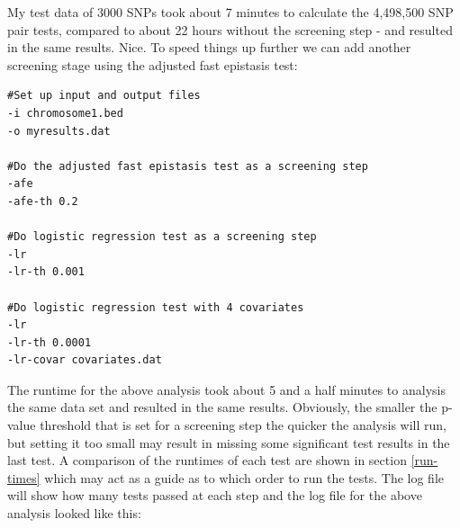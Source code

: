\documentclass[a4paper,12pt]{article}
\begin{document}
My test data of 3000 SNPs took about 7 minutes to calculate the 4,498,500 SNP pair tests, compared to about 22 hours without the screening step - and resulted in the same results. Nice. To speed things up further we can add another screening stage using the adjusted fast epistasis test: 
\vspace{0.35cm} \begin{lstlisting}
#Set up input and output files
-i chromosome1.bed
-o myresults.dat

#Do the adjusted fast epistasis test as a screening step
-afe
-afe-th 0.2

#Do logistic regression test as a screening step
-lr
-lr-th 0.001

#Do logistic regression test with 4 covariates
-lr
-lr-th 0.0001
-lr-covar covariates.dat

\end{lstlisting} \vspace{0.35cm}
The runtime for the above analysis took about 5 and a half minutes to analysis the same data set and resulted in the same results. Obviously, the smaller the p-value threshold that is set for a screening step the quicker the analysis will run, but setting it too small may result in missing some significant test results in the last test. A comparison of the runtimes of each test are shown in  section \ref{run-times} which may act as a guide as to which order to run the tests. The log file will show how many tests passed at each step and the log file for the above analysis looked like this: 
\end{document}
